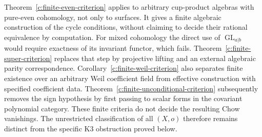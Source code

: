 \begin{remark}
\label{c:finite-criterion-scope}
Theorem~\ref{c:finite-even-criterion} applies to arbitrary cup-product
algebras with pure-even cohomology, not only to surfaces.  It gives
a finite algebraic construction of the cycle conditions, without
claiming to decide their rational equivalence by computation.
For mixed cohomology the direct use of
$\operatorname{GL}_{a|b}$ would require exactness of its invariant
functor, which fails.  Theorem~\ref{c:finite-super-criterion}
replaces that step by projective lifting and an external algebraic
parity correspondence.  Corollary~\ref{c:finite-weil-criterion}
also separates finite existence over an arbitrary Weil coefficient
field from effective construction with specified coefficient data.
Theorem~\ref{c:finite-unconditional-criterion} subsequently removes
the sign hypothesis by first passing to scalar forms in the
covariant polynomial category.  These finite criteria do not
decide the resulting Chow vanishings.
The unrestricted classification of all $(X,o)$ therefore remains
distinct from the specific K3 obstruction proved below.
\end{remark}

